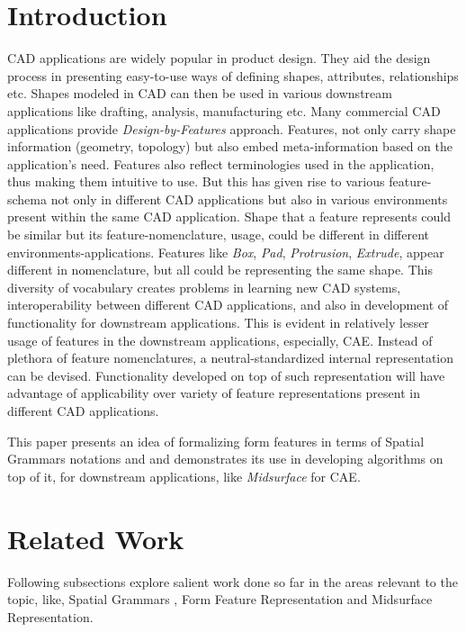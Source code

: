 
\section{Introduction}

CAD applications are widely popular in product design. They aid the design process in presenting easy-to-use ways of defining shapes, attributes, relationships etc. Shapes modeled in CAD can then be used in various downstream applications like drafting, analysis, manufacturing etc. Many commercial CAD applications provide {\em Design-by-Features} approach. Features, not only carry shape information (geometry, topology) but also embed meta-information based on the application's need. Features also reflect terminologies used in the application, thus making them intuitive to use. But this has given rise to various feature-schema not only in different CAD applications but also in various environments present within the same CAD application. Shape that a feature represents could be similar but its feature-nomenclature, usage, could be different in different environments-applications. Features like {\em Box}, {\em Pad}, {\em Protrusion}, {\em Extrude}, appear different in nomenclature, but all could be representing the same shape. This diversity of vocabulary creates problems in learning new CAD systems, interoperability between different CAD applications, and also in development of functionality for downstream applications. This is evident in relatively lesser usage of features in the downstream applications, especially, CAE.  Instead of plethora of feature nomenclatures, a neutral-standardized internal representation can be devised. Functionality developed on top of such representation will have advantage of applicability over variety of feature representations present in different CAD applications.

This paper presents an idea of formalizing form features in terms of  Spatial Grammars notations and  and demonstrates its use in developing algorithms on top of it, for downstream applications, like {\em Midsurface} for CAE. 

\section{Related Work}

	Following subsections explore salient work done so far in the areas relevant to the topic, like,  Spatial Grammars , Form Feature Representation and Midsurface Representation.

